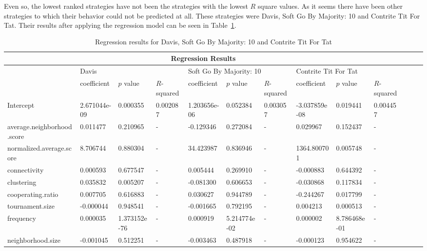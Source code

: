 Even so, the lowest ranked strategies have not been the strategies with the lowest
\(R\) square values. As it seems there have been other strategies to which their behavior
could not be predicted at all. These strategies were Davis, Soft Go By Majority: 10
and Contrite Tit For Tat. Their results after applying the regression model
can be seen in Table~\ref{reg-for-r-bot}.

\begin{table}[!hbtp]
	\centering
	\begin{adjustbox}{width=0.9\textwidth}
		\small
		\begin{tabular}{|l|l|l|l|l|l|l|l|l|l|l|l|l|}
			\hline
			\multicolumn{10}{|c|}{Regression Results}                                                                       \\ \hline
			& \multicolumn{3}{l|}{Davis} & \multicolumn{3}{l|}{Soft Go By Majority: 10} & \multicolumn{3}{l|}{Contrite Tit For Tat}\\ \hline
			  & coefficient & \(p\) value & \(R\)-squared & coefficient & \(p\) value & \(R\)-squared & coefficient & \(p\) value & \(R\)-squared \\ \hline
			Intercept 								 &2.671044e-09  & 0.000355			& 0.002087	& 1.203656e-06	& 0.052384	& 0.003057	& -3.037859e-08 & 0.019441		 & 0.004457	\\ \hline
			average.neighborhood.score & 0.011477			& 0.210965			&	-					& -0.129346			& 0.272084 	& -					& 0.029967  		& 0.152437			& -         \\ \hline
			normalized.average.score	 & 8.706744			& 0.880304 			&	-					& 34.423987			& 0.836946 	& -					& 1364.800701 	& 0.005748			& -         \\ \hline
			connectivity							 & 0.000593			& 0.677547			&	-					& 0.005444			& 0.269910 	& -					& -0.000883			& 0.644392			& -         \\ \hline
			clustering  							 & 0.035832			& 0.005207			&	-					& -0.081300			& 0.606653	& -					& -0.030868 		& 0.117834			& -         \\ \hline
			cooperating.ratio					 & 0.007705			& 0.616883			&	-					& 0.030627 			& 0.944789 	& -					& -0.244267			& 0.017799			& -         \\ \hline
			tournament.size						 &-0.000044			& 0.948541			&	-					& -0.001665 		& 0.792195 	& -					& 0.004213 			& 0.000513			& -         \\ \hline
			frequency									 &0.000035			& 1.373152e-76	&	-					& 0.000919			& 5.214774e-02	& -			&  0.000002			& 8.786468e-01	& -         \\ \hline
			neighborhood.size			     &-0.001045			& 0.512251 			&	-					& -0.003463			& 0.487918			& -			& -0.000123 		& 0.954622	& -         		\\ \hline
		\end{tabular}
	\end{adjustbox}
	\caption{Regression results for Davis, Soft Go By Majority: 10 and Contrite Tit For Tat}
	\label{reg-for-r-bot}
\end{table}

